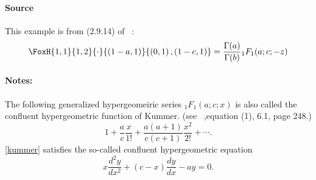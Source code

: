 \paragraph{Source} This example is from (2.9.14) of
~\cite{kilbas.saigo:04:h-transforms}:
\begin{align*}
  \FoxH
    {1,1}
    {1,2}
    {\cdot}
    {\left(1-a, 1\right)}
    {\left(0, 1\right), \left(1-c, 1\right)}=\frac{\Gamma(a)}{\Gamma(b)}{}_1F_1(a;c;-z)
\end{align*}
\paragraph{Notes:}
The following generalized hypergeomeiric series ${}_1F_1(a;c;x)$ is also called the confluent hypergeometric function of Kummer. (see ~\cite{erdelyi.magnus.ea:81:higher*1},equation (1), 6.1, page 248.) 
\begin{equation}\label{kummer} 
1+ \frac{a}{c}\frac{x}{1!} + \frac{a(a+1)}{c(c+1)}\frac{x^2}{2!} + \cdots .
\end{equation}
\eqref{kummer} satisfies the so-called confluent hypergeometric equation
$$ x \frac{d^2 y}{d x^2}+(c-x) \frac{d y}{d x}-a y=0.$$


